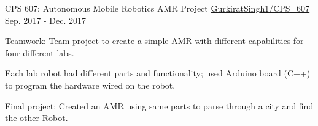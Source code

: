    \begin{cventries}   
  \cventry
    {CPS 607: Autonomous Mobile Robotics}
    {AMR Project}
    {\href{https://github.com/GurkiratSingh1/CPS_607}{\faGithub \hspace{1mm} GurkiratSingh1/CPS\_607}}
    {Sep. 2017 - Dec. 2017}
    {
      \begin{cvitems}
        \item {Teamwork: Team project to create a simple AMR with different capabilities for four different labs.}
        \item {Each lab robot had different parts and functionality; used Arduino board (C++) to program the hardware wired on the robot.}
        \item{Final project: Created an AMR using same parts to parse through a city and find the other Robot.}\\
      \end{cvitems}
      \vspace*{-3mm}
    }
\end{cventries}
\vspace*{-6mm}